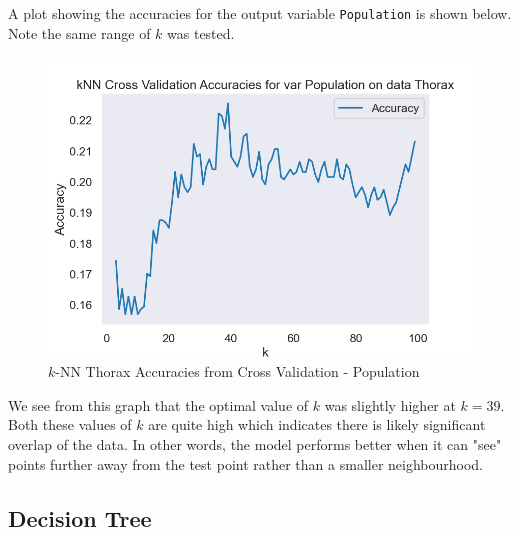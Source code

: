 \documentclass{article}
\begin{document}
\newpage

A plot showing the accuracies for the output variable \texttt{Population} is shown below. Note the same range of $k$ was tested.

\begin{figure}[htb]
    \centering
    \includegraphics[width=0.8\columnwidth]{plots/Thorax_knn_accuracies_Population.png}
    \caption{$k$-NN Thorax Accuracies from Cross Validation - Population}
    \label{fig:knn_thorax_cv_accuracies_pop}
\end{figure}

We see from this graph that the optimal value of $k$ was slightly higher at $k = 39$. Both these values of $k$ are quite high which indicates there is likely significant overlap of the data. In other words, the model performs better when it can "see" points further away from the test point rather than a smaller neighbourhood.

\newpage
\subsection{Decision Tree}
\end{document}
